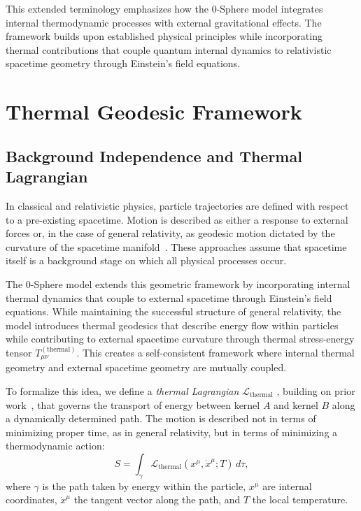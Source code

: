 \documentclass[%
 reprint,
 amsmath,amssymb,
 aps,
]{revtex4-1}
\numberwithin{equation}{section}%
\begin{document}
This extended terminology emphasizes how the 0-Sphere model integrates internal thermodynamic processes with external gravitational effects. The framework builds upon established physical principles while incorporating thermal contributions that couple quantum internal dynamics to relativistic spacetime geometry through Einstein's field equations.

\section{Thermal Geodesic Framework}
\label{sec:thermal_geodesic_framework}

\subsection{Background Independence and Thermal Lagrangian}
\label{subsec:background_independence}

In classical and relativistic physics, particle trajectories are defined with respect to a pre-existing spacetime. Motion is described as either a response to external forces or, in the case of general relativity, as geodesic motion dictated by the curvature of the spacetime manifold~\cite{landau1975, misner1973}. These approaches assume that spacetime itself is a background stage on which all physical processes occur.

The 0-Sphere model extends this geometric framework by incorporating internal thermal dynamics that couple to external spacetime through Einstein's field equations. While maintaining the successful structure of general relativity, the model introduces thermal geodesics that describe energy flow within particles while contributing to external spacetime curvature through thermal stress-energy tensor $T_{\mu\nu}^{(\text{thermal})}$. This creates a self-consistent framework where internal thermal geometry and external spacetime geometry are mutually coupled. 

To formalize this idea, we define a \textit{thermal Lagrangian} $\mathcal{L}_{\text{thermal}}$ , building on prior work~\cite{hanamura2506.0031}, that governs the transport of energy between kernel $A$ and kernel $B$ along a dynamically determined path. The motion is described not in terms of minimizing proper time, as in general relativity, but in terms of minimizing a thermodynamic action:
\begin{equation} \label{eq:thermal_action}
S = \int_{\gamma} \mathcal{L}_{\text{thermal}}(x^\mu, \dot{x}^\mu; T)\, d\tau,
\end{equation}
where $\gamma$ is the path taken by energy within the particle, $x^\mu$ are internal coordinates, $\dot{x}^\mu$ the tangent vector along the path, and $T$ the local temperature.
\end{document}

